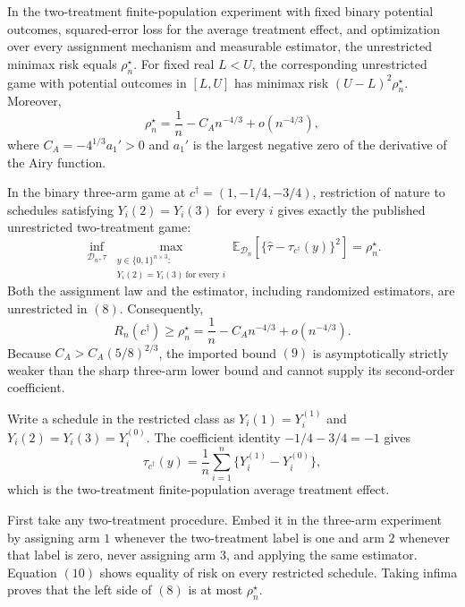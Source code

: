 In the two-treatment finite-population experiment with fixed binary potential outcomes, squared-error loss for the average treatment effect, and optimization over every assignment mechanism and measurable estimator, the unrestricted minimax risk equals \(\rho_n^\star\).  For fixed real \(L<U\), the corresponding unrestricted game with potential outcomes in \([L,U]\) has minimax risk \((U-L)^2\rho_n^\star\).  Moreover,
\[
 \rho_n^\star=\frac1n-C_An^{-4/3}+o(n^{-4/3}),
\]
where \(C_A=-4^{1/3}a_1'>0\) and \(a_1'\) is the largest negative zero of the derivative of the Airy function.

In the binary three-arm game at \(c^\dagger=(1,-1/4,-3/4)\), restriction of nature to schedules satisfying \(Y_i(2)=Y_i(3)\) for every \(i\) gives exactly the published unrestricted two-treatment game:
\[
 \inf_{\mathcal D_n,\widehat\tau}
 \max_{\substack{y\in\{0,1\}^{n\times3}:\\Y_i(2)=Y_i(3)\ \text{for every }i}}
 \mathbb E_{\mathcal D_n}\!\left[
 \{\widehat\tau-\tau_{c^\dagger}(y)\}^2\right]
 =\rho_n^\star.
\tag{8}
\]
Both the assignment law and the estimator, including randomized estimators, are unrestricted in \((8)\).  Consequently,
\[
 R_n(c^\dagger)\ge\rho_n^\star
 =\frac1n-C_An^{-4/3}+o(n^{-4/3}).
\tag{9}
\]
Because
\(C_A>C_A(5/8)^{2/3}\), the imported bound \((9)\) is asymptotically strictly weaker than the sharp three-arm lower bound and cannot supply its second-order coefficient.

Write a schedule in the restricted class as
\(
Y_i(1)=Y_i^{(1)}
\) and
\(
Y_i(2)=Y_i(3)=Y_i^{(0)}
\).  The coefficient identity \(-1/4-3/4=-1\) gives
\[
 \tau_{c^\dagger}(y)
 =\frac1n\sum_{i=1}^n\{Y_i^{(1)}-Y_i^{(0)}\},
\tag{10}
\]
which is the two-treatment finite-population average treatment effect.

First take any two-treatment procedure.  Embed it in the three-arm experiment by assigning arm \(1\) whenever the two-treatment label is one and arm \(2\) whenever that label is zero, never assigning arm \(3\), and applying the same estimator.  Equation \((10)\) shows equality of risk on every restricted schedule.  Taking infima proves that the left side of \((8)\) is at most \(\rho_n^\star\).

